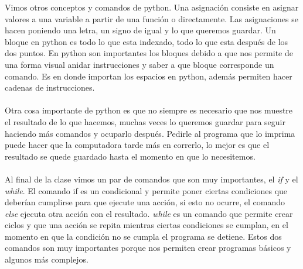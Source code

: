 \documentclass{book}
\begin{document}
	Vimos otros conceptos y comandos de python. Una asignación consiste en asignar valores a una variable a partir de una función o directamente. Las asignaciones se hacen poniendo una letra, un signo de igual y lo que queremos guardar.
	Un bloque en python es todo lo que esta indexado, todo lo que esta después de los dos puntos. En python son importantes los bloques debido a que nos permite de una forma visual anidar instrucciones y saber a que bloque corresponde un comando. Es en donde importan los espacios en python, además permiten hacer cadenas de instrucciones.\\
	\\
	Otra cosa importante de python es que no siempre es necesario que nos muestre el resultado de lo que hacemos, muchas veces lo queremos guardar para seguir haciendo más comandos y ocuparlo después. Pedirle al programa que lo imprima puede hacer que la computadora tarde más en correrlo, lo mejor es que el resultado se quede guardado hasta el momento en que lo necesitemos.\\
	\\
	Al final de la clase vimos un par de comandos que son muy importantes, el \textit{if} y el \textit{while}. El comando if es un condicional y permite poner ciertas condiciones que deberían cumplirse para que ejecute una acción, si esto no ocurre, el comando \textit{else} ejecuta otra acción con el resultado. \textit{while} es un comando que permite crear ciclos y que una acción se repita mientras ciertas condiciones se cumplan, en el momento en que la condición no se cumpla el programa se detiene. Estos dos comandos son muy importantes porque nos permiten crear programas básicos y algunos más complejos.
	
\end{document}
